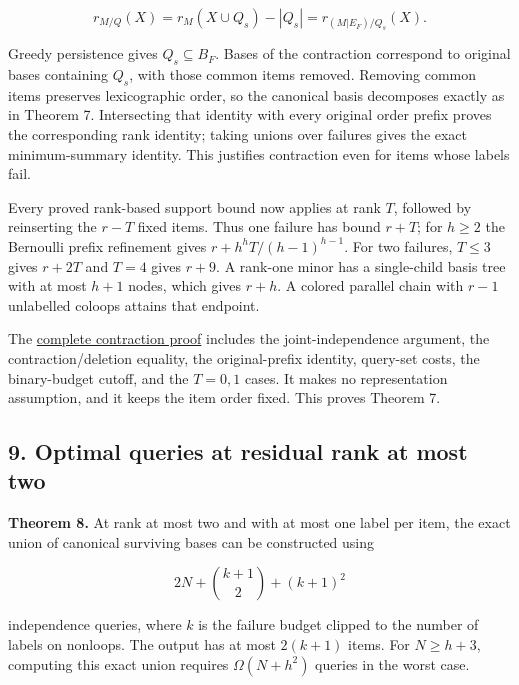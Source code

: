 \[
r_{M/Q}(X)=r_M(X\cup Q_s)-|Q_s|
          =r_{(M|E_F)/Q_s}(X).
\]

Greedy persistence gives \(Q_s\subseteq B_F\). Bases of the contraction correspond to original bases containing \(Q_s\), with those common items removed. Removing common items preserves lexicographic order, so the canonical basis decomposes exactly as in Theorem 7. Intersecting that identity with every original order prefix proves the corresponding rank identity; taking unions over failures gives the exact minimum-summary identity. This justifies contraction even for items whose labels fail.

Every proved rank-based support bound now applies at rank \(T\), followed by reinserting the \(r-T\) fixed items. Thus one failure has bound \(r+T\); for \(h\ge2\) the Bernoulli prefix refinement gives \(r+h^hT/(h-1)^{h-1}\). For two failures, \(T\le3\) gives \(r+2T\) and \(T=4\) gives \(r+9\). A rank-one minor has a single-child basis tree with at most \(h+1\) nodes, which gives \(r+h\). A colored parallel chain with \(r-1\) unlabelled coloops attains that endpoint.

The \href{https://github.com/icekylinx/algorithm-frontier/blob/main/problems/matroid-failure-summaries/manuscripts/rank-loss-contraction-for-prefix-summaries.md}{complete contraction proof} includes the joint-independence argument, the contraction/deletion equality, the original-prefix identity, query-set costs, the binary-budget cutoff, and the \(T=0,1\) cases. It makes no representation assumption, and it keeps the item order fixed. This proves Theorem 7.

\hypertarget{af-240b5086c5-optimal-queries-at-residual-rank-at-most-two}{%
\subsection{9. Optimal queries at residual rank at most two}\label{af-240b5086c5-optimal-queries-at-residual-rank-at-most-two}}

\textbf{Theorem 8.} At rank at most two and with at most one label per item, the exact union of canonical surviving bases can be constructed using

\[
2N+\binom{k+1}{2}+(k+1)^2
\]

independence queries, where \(k\) is the failure budget clipped to the number of labels on nonloops. The output has at most \(2(k+1)\) items. For \(N\ge h+3\), computing this exact union requires \(\Omega(N+h^2)\) queries in the worst case.

